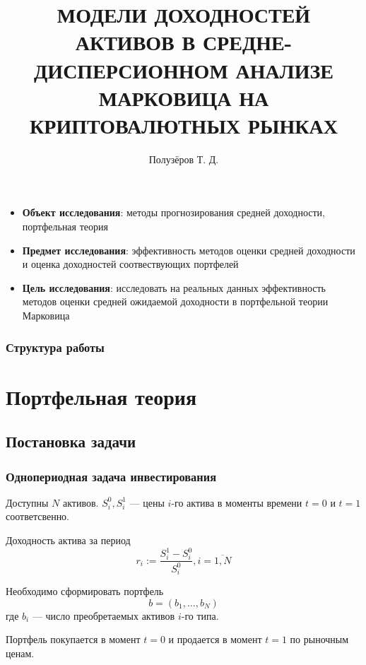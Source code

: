 \documentclass{beamer}
\title[]{МОДЕЛИ ДОХОДНОСТЕЙ АКТИВОВ В СРЕДНЕ-ДИСПЕРСИОННОМ АНАЛИЗЕ МАРКОВИЦА НА КРИПТОВАЛЮТНЫХ РЫНКАХ}
\subtitle{}
\author{Полузёров Т. Д.}
\institute{БГУ ФПМИ}
\date{}
\begin{document}
\begin{frame}
    \titlepage
\end{frame}

\begin{frame}
    \begin{itemize}
        \item \textbf{Объект исследования}: методы прогнозирования средней доходности, портфельная теория
        
        \item \textbf{Предмет исследования}: эффективность методов оценки средней доходности и 
        оценка доходностей соотвествующих портфелей
        
        \item \textbf{Цель исследования}: исследовать на реальных данных эффективность методов
        оценки средней ожидаемой доходности в портфельной теории Марковица
    \end{itemize}
\end{frame}

\begin{frame}
    \begin{center}
        \frametitle{Структура работы}
        \tableofcontents
    \end{center}
\end{frame}

\section{Портфельная теория}

\subsection{Постановка задачи}

\begin{frame}
    \frametitle{Однопериодная задача инвестирования}
    Доступны $N$ активов.
    $S_i^0, S_i^1$ --- цены $i$-го актива в моменты времени $t=0$ и
    $t=1$ соответсвенно.

    Доходность актива за период
    \[
        r_i := \frac{S_i^1 - S_i^0}{S_i^0}, i=\overline{1, N}
    \]

    Необходимо сформировать портфель
    \[
        b = (b_1, \dots, b_N)
    \]
    где $b_i$ --- число преобретаемых активов $i$-го типа.

    Портфель покупается в момент $t=0$ и продается в момент $t=1$ по рыночным ценам.
\end{frame}
\end{document}
